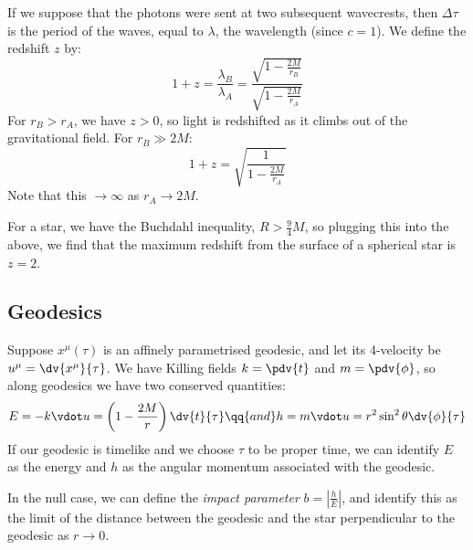 \documentclass{jknotes}
\begin{document}
If we suppose that the photons were sent at two subsequent wavecrests, then \(\Delta \tau\) is the period of the waves, equal to \(\lambda\), the wavelength (since \(c=1\)). We define the redshift \(z\) by:
\begin{equation}
    1 + z = \frac{\lambda_B}{\lambda_A} = \frac{\sqrt{1 - \frac{2M}{r_B}}}{\sqrt{1-\frac{2M}{r_A}}}
\end{equation}
For \(r_B > r_A\), we have \(z>0\), so light is redshifted as it climbs out of the gravitational field. For \(r_B\gg 2M\):
\begin{equation}
    1 + z = \sqrt{\frac{1}{1 - \frac{2M}{r_A}}}
\end{equation}
Note that this \(\rightarrow \infty\) as \(r_A\rightarrow2M\).

For a star, we have the Buchdahl inequality, \(R>\frac{9}{4}M\), so plugging this into the above, we find that the maximum redshift from the surface of a spherical star is \(z=2\).

\subsection{Geodesics}
Suppose \(x^\mu(\tau)\) is an affinely parametrised geodesic, and let its 4-velocity be \(u^\mu = \dv{x^\mu}{\tau}\). We have Killing fields \(k=\pdv{t}\) and \(m=\pdv{\phi}\), so along geodesics we have two conserved quantities:
\begin{equation}
    E=-k\vdot u = \left( 1-\frac{2M}{r} \right)\dv{t}{\tau}
    \qq{and}
    h = m\vdot u = r^2\sin^2\theta\dv{\phi}{\tau}
\end{equation}
If our geodesic is timelike and we choose \(\tau\) to be proper time, we can identify \(E\) as the energy and \(h\) as the angular momentum associated with the geodesic.

In the null case, we can define the \emph{impact parameter} \(b = \left|\frac{h}{E}\right|\), and identify this as the limit of the distance between the geodesic and the star perpendicular to the geodesic as \(r\rightarrow 0\).
\begin{figure}[H]
    \centering
\end{figure}
\end{document}
